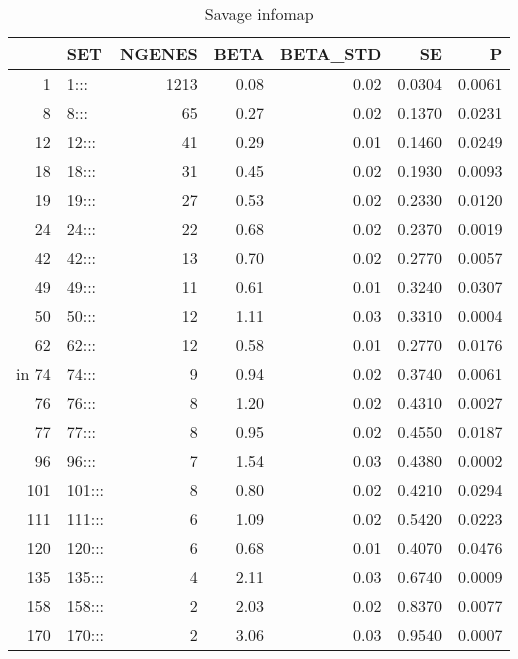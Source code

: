 \begin{table}[ht]
\centering
\begin{tabular}{rlrrrrr}
  \hline
 & SET & NGENES & BETA & BETA\_STD & SE & P \\ 
  \hline
1 & 1::: & 1213 & 0.08 & 0.02 & 0.0304 & 0.0061 \\ 
  8 & 8::: & 65 & 0.27 & 0.02 & 0.1370 & 0.0231 \\ 
  12 & 12::: & 41 & 0.29 & 0.01 & 0.1460 & 0.0249 \\ 
  18 & 18::: & 31 & 0.45 & 0.02 & 0.1930 & 0.0093 \\ 
  19 & 19::: & 27 & 0.53 & 0.02 & 0.2330 & 0.0120 \\ 
  24 & 24::: & 22 & 0.68 & 0.02 & 0.2370 & 0.0019 \\ 
  42 & 42::: & 13 & 0.70 & 0.02 & 0.2770 & 0.0057 \\ 
  49 & 49::: & 11 & 0.61 & 0.01 & 0.3240 & 0.0307 \\ 
  50 & 50::: & 12 & 1.11 & 0.03 & 0.3310 & 0.0004 \\ 
  62 & 62::: & 12 & 0.58 & 0.01 & 0.2770 & 0.0176 \\ in
  74 & 74::: &  9 & 0.94 & 0.02 & 0.3740 & 0.0061 \\ 
  76 & 76::: &  8 & 1.20 & 0.02 & 0.4310 & 0.0027 \\ 
  77 & 77::: &  8 & 0.95 & 0.02 & 0.4550 & 0.0187 \\ 
  96 & 96::: &  7 & 1.54 & 0.03 & 0.4380 & 0.0002 \\ 
  101 & 101::: &  8 & 0.80 & 0.02 & 0.4210 & 0.0294 \\ 
  111 & 111::: &  6 & 1.09 & 0.02 & 0.5420 & 0.0223 \\ 
  120 & 120::: &  6 & 0.68 & 0.01 & 0.4070 & 0.0476 \\ 
  135 & 135::: &  4 & 2.11 & 0.03 & 0.6740 & 0.0009 \\ 
  158 & 158::: &  2 & 2.03 & 0.02 & 0.8370 & 0.0077 \\ 
  170 & 170::: &  2 & 3.06 & 0.03 & 0.9540 & 0.0007 \\ 
   \hline
\end{tabular}
\caption{Savage infomap}
\label{tab:Infomap savage}
\end{table}


